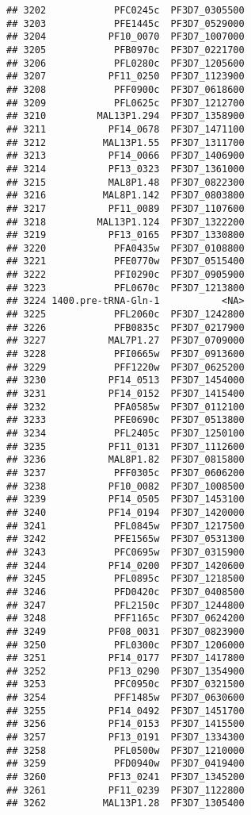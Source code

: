 \documentclass[12pt, a4paper]{article}\usepackage[]{graphicx}\usepackage[]{color}
\makeatletter
\newenvironment{kframe}{%
 \def\at@end@of@kframe{}%
 \ifinner\ifhmode%
  \def\at@end@of@kframe{\end{minipage}}%
  \begin{minipage}{\columnwidth}%
 \fi\fi%
 \def\FrameCommand##1{\hskip\@totalleftmargin \hskip-\fboxsep
 \colorbox{shadecolor}{##1}\hskip-\fboxsep
     \hskip-\linewidth \hskip-\@totalleftmargin \hskip\columnwidth}%
 \MakeFramed {\advance\hsize-\width
   \@totalleftmargin\z@ \linewidth\hsize
   \@setminipage}}%
 {\par\unskip\endMakeFramed%
 \at@end@of@kframe}
\newenvironment{knitrout}{}{} %
\makeatother
\begin{document}
\begin{knitrout}
\begin{kframe}
\begin{verbatim}
## 3202            PFC0245c  PF3D7_0305500
## 3203            PFE1445c  PF3D7_0529000
## 3204           PF10_0070  PF3D7_1007000
## 3205            PFB0970c  PF3D7_0221700
## 3206            PFL0280c  PF3D7_1205600
## 3207           PF11_0250  PF3D7_1123900
## 3208            PFF0900c  PF3D7_0618600
## 3209            PFL0625c  PF3D7_1212700
## 3210         MAL13P1.294  PF3D7_1358900
## 3211           PF14_0678  PF3D7_1471100
## 3212          MAL13P1.55  PF3D7_1311700
## 3213           PF14_0066  PF3D7_1406900
## 3214           PF13_0323  PF3D7_1361000
## 3215           MAL8P1.48  PF3D7_0822300
## 3216          MAL8P1.142  PF3D7_0803800
## 3217           PF11_0089  PF3D7_1107600
## 3218         MAL13P1.124  PF3D7_1322200
## 3219           PF13_0165  PF3D7_1330800
## 3220            PFA0435w  PF3D7_0108800
## 3221            PFE0770w  PF3D7_0515400
## 3222            PFI0290c  PF3D7_0905900
## 3223            PFL0670c  PF3D7_1213800
## 3224 1400.pre-tRNA-Gln-1           <NA>
## 3225            PFL2060c  PF3D7_1242800
## 3226            PFB0835c  PF3D7_0217900
## 3227           MAL7P1.27  PF3D7_0709000
## 3228            PFI0665w  PF3D7_0913600
## 3229            PFF1220w  PF3D7_0625200
## 3230           PF14_0513  PF3D7_1454000
## 3231           PF14_0152  PF3D7_1415400
## 3232            PFA0585w  PF3D7_0112100
## 3233            PFE0690c  PF3D7_0513800
## 3234            PFL2405c  PF3D7_1250100
## 3235           PF11_0131  PF3D7_1112600
## 3236           MAL8P1.82  PF3D7_0815800
## 3237            PFF0305c  PF3D7_0606200
## 3238           PF10_0082  PF3D7_1008500
## 3239           PF14_0505  PF3D7_1453100
## 3240           PF14_0194  PF3D7_1420000
## 3241            PFL0845w  PF3D7_1217500
## 3242            PFE1565w  PF3D7_0531300
## 3243            PFC0695w  PF3D7_0315900
## 3244           PF14_0200  PF3D7_1420600
## 3245            PFL0895c  PF3D7_1218500
## 3246            PFD0420c  PF3D7_0408500
## 3247            PFL2150c  PF3D7_1244800
## 3248            PFF1165c  PF3D7_0624200
## 3249           PF08_0031  PF3D7_0823900
## 3250            PFL0300c  PF3D7_1206000
## 3251           PF14_0177  PF3D7_1417800
## 3252           PF13_0290  PF3D7_1354900
## 3253            PFC0950c  PF3D7_0321500
## 3254            PFF1485w  PF3D7_0630600
## 3255           PF14_0492  PF3D7_1451700
## 3256           PF14_0153  PF3D7_1415500
## 3257           PF13_0191  PF3D7_1334300
## 3258            PFL0500w  PF3D7_1210000
## 3259            PFD0940w  PF3D7_0419400
## 3260           PF13_0241  PF3D7_1345200
## 3261           PF11_0239  PF3D7_1122800
## 3262          MAL13P1.28  PF3D7_1305400

\end{verbatim}
\end{kframe}
\end{knitrout}
\end{document}

